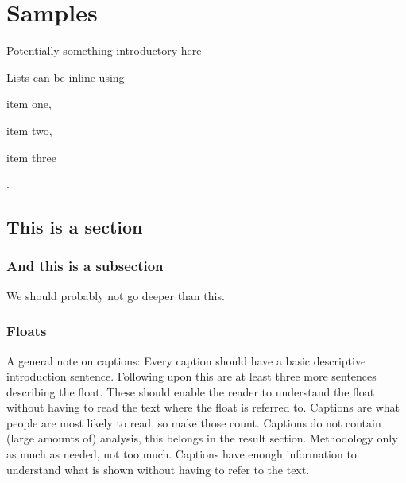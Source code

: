 \chapter{Samples}
\label{cp:samples}

Potentially something introductory here

Lists can be inline using \begin{inlinelist} \item item one, \item item two, \item item three \end{inlinelist}.
\section{This is a section}
\label{sec:samplesec}
\subsection{And this is a subsection}
\label{sec:asubsec}
We should probably not go deeper than this.
\subsection{Floats}
\label{sec:floats}
A general note on captions: Every caption should have a basic descriptive introduction sentence. Following upon this are at least three more sentences describing the float.
These should enable the reader to understand the float without having to read the text where the float is referred to. Captions are what people are most likely to read, so make those count.
Captions do not contain (large amounts of) analysis, this belongs in the result section. Methodology only as much as needed, not too much. Captions have enough information to understand
what is shown without having to refer to the text.

